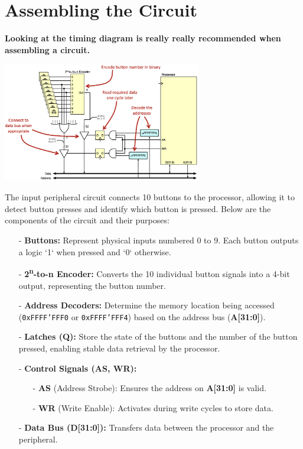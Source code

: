 \section{Assembling the Circuit}
\textbf{Looking at the timing diagram is really really recommended when assembling a circuit.}
\begin{center}
    \includegraphics[width=0.65\textwidth]{chapters/chapter2e/images/circuit.png}
\end{center}

The input peripheral circuit connects 10 buttons to the processor, allowing it to detect button presses and identify which button is pressed. Below are the components of the circuit and their purposes:
\begin{itemize}
    \item[-] \textbf{Buttons:} Represent physical inputs numbered 0 to 9. Each button outputs a logic `1` when pressed and `0` otherwise.
    \item[-] \textbf{2\textsuperscript{n}-to-n Encoder:} Converts the 10 individual button signals into a 4-bit output, representing the button number.
    \item[-] \textbf{Address Decoders:} Determine the memory location being accessed (\texttt{0xFFFF'FFF0} or \texttt{0xFFFF'FFF4}) based on the address bus (\textbf{A[31:0]}).
    \item[-] \textbf{Latches (Q):} Store the state of the buttons and the number of the button pressed, enabling stable data retrieval by the processor.
    \item[-] \textbf{Control Signals (\textbf{AS}, \textbf{WR}):} 
    \begin{itemize}
        \item[-] \textbf{AS} (Address Strobe): Ensures the address on \textbf{A[31:0]} is valid.
        \item[-] \textbf{WR} (Write Enable): Activates during write cycles to store data.
    \end{itemize}
    \item[-] \textbf{Data Bus (\textbf{D[31:0]}):} Transfers data between the processor and the peripheral.
\end{itemize}

